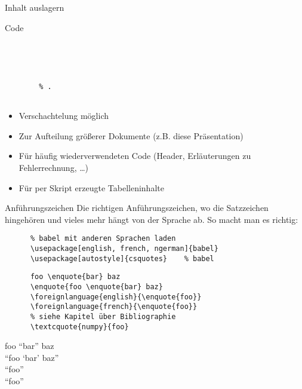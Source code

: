 \begin{frame}[fragile]{Inhalt auslagern}
  \begin{block}{Code}
    \begin{verbatim}
      
      
        
        
        % .
      
    \end{verbatim}
  \end{block}
  \begin{itemize}
    \item Verschachtelung möglich
    \item Zur Aufteilung größerer Dokumente (z.B. diese Präsentation)
    \item Für häufig wiederverwendeten Code (Header, Erläuterungen zu Fehlerrechnung, …)
    \item Für per Skript erzeugte Tabelleninhalte
  \end{itemize}
\end{frame}

\begin{frame}[fragile]{
  Anführungszeichen
  \hfill
}
  Die richtigen Anführungszeichen, wo die Satzzeichen hingehören und vieles mehr hängt von der Sprache ab.
  So macht man es richtig:
  \begin{Packages}
    \begin{verbatim}
      % babel mit anderen Sprachen laden
      \usepackage[english, french, ngerman]{babel}
      \usepackage[autostyle]{csquotes}    % babel
    \end{verbatim}
  \end{Packages}
  \begin{CodeExample}{0.60}
    \begin{verbatim}
      foo \enquote{bar} baz
      \enquote{foo \enquote{bar} baz}
      \foreignlanguage{english}{\enquote{foo}}
      \foreignlanguage{french}{\enquote{foo}}
      % siehe Kapitel über Bibliographie
      \textcquote{numpy}{foo}
    \end{verbatim}
  \CodeResult
    \strut
    foo \enquote{bar} baz \\
    \enquote{foo \enquote{bar} baz} \\
    \foreignlanguage{english}{\enquote{foo}}\\
    \foreignlanguage{french}{\enquote{foo}}\\[\baselineskip]
  \end{CodeExample}
\end{frame}
